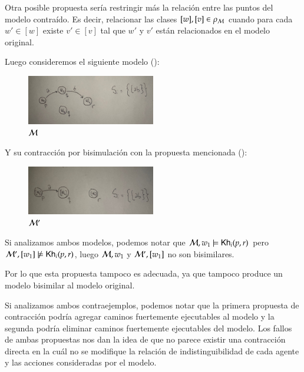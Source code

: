 Otra posible propuesta sería restringir más la relación entre las puntos del modelo contraído. Es decir, relacionar las clases 
$[w], [v] \in \rho_{\mathcal{M}}$ cuando para cada $w' \in [w]$ existe $v' \in [v]$ tal que $w'$ y $v'$ están relacionados en el modelo original.

Luego consideremos el siguiente modelo ():

\begin{figure}[h]
    \centering
    \includegraphics[width=0.5\textwidth]{imagenes/2da_propuesta_original.jpeg}
    \caption{$\mathcal{M}$}
    \label{fig:2ndproposaloriginal}
\end{figure}

Y su contracción por bisimulación con la propuesta mencionada ():

\begin{figure}[h]
    \centering
    \includegraphics[width=0.5\textwidth]{imagenes/2da_propuesta_contraido.jpeg}
    \caption{$\mathcal{M}'$}
    \label{fig:2ndproposalcontraction}
\end{figure}

Si analizamos ambos modelos, podemos notar que $\mathcal{M},w_1 \models \mathsf{Kh}_i(p,r)$ pero $\mathcal{M}',[w_1] \not\models \mathsf{Kh}_i(p,r)$, luego 
$\mathcal{M},w_1$ y $\mathcal{M}',[w_1]$ no son bisimilares.

Por lo que esta propuesta tampoco es adecuada, ya que tampoco produce un modelo bisimilar al modelo original.

Si analizamos ambos contraejemplos, podemos notar que la primera propuesta de contracción podría agregar caminos fuertemente ejecutables al modelo 
y la segunda podría eliminar caminos fuertemente ejecutables del modelo. Los fallos de ambas propuestas nos dan la idea de que no parece 
existir una contracción directa en la cuál no se modifique la relación de indistinguibilidad de cada agente y las acciones 
consideradas por el modelo. 

